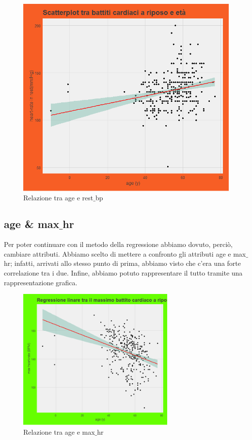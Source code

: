 \documentclass{article}
\begin{document}
\begin{figure}[h]
	\centering
	\includegraphics[width=1\textwidth]{age e restbp.png}
	\caption{Relazione tra age e rest$\_$bp}
	\label {fig:ds1}
\end{figure}

\subsection { age \& max$\_$hr }
Per poter continuare con il metodo della regressione abbiamo dovuto, perciò, cambiare attributi. Abbiamo scelto di mettere a confronto gli attributi age e max$\_$hr; infatti, arrivati allo stesso punto di prima, abbiamo visto che c’era una forte correlazione tra i due. Infine, abbiamo potuto rappresentare il tutto tramite una rappresentazione grafica. 

\begin{figure}[h]
	\centering
	\includegraphics[width=0.7\textwidth]{age e maxhr.png}
	\caption{Relazione tra age e max$\_$hr}
	\label {fig:ds1}
\end{figure}
\end{document}
